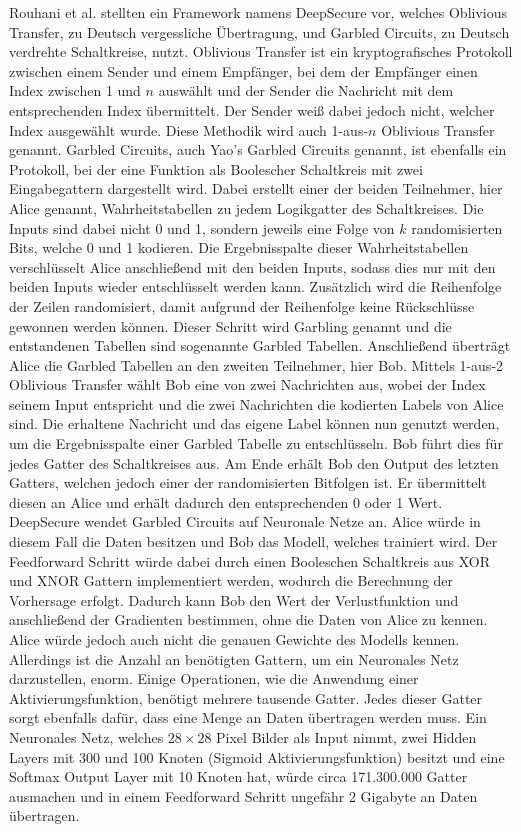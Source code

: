Rouhani et al. \cite{P-71} stellten ein Framework namens DeepSecure vor, welches Oblivious Transfer, zu Deutsch vergessliche Übertragung, und Garbled Circuits, zu Deutsch verdrehte Schaltkreise, nutzt.
Oblivious Transfer ist ein kryptografisches Protokoll zwischen einem Sender und einem Empfänger, bei dem der Empfänger einen Index zwischen 1 und $n$ auswählt und der Sender die Nachricht mit dem entsprechenden Index übermittelt. 
Der Sender weiß dabei jedoch nicht, welcher Index ausgewählt wurde.
Diese Methodik wird auch 1-aus-$n$ Oblivious Transfer genannt.
Garbled Circuits, auch Yao's Garbled Circuits genannt, ist ebenfalls ein Protokoll, bei der eine Funktion als Boolescher Schaltkreis mit zwei Eingabegattern dargestellt wird.
Dabei erstellt einer der beiden Teilnehmer, hier Alice genannt, Wahrheitstabellen zu jedem Logikgatter des Schaltkreises. 
Die Inputs sind dabei nicht 0 und 1, sondern jeweils eine Folge von $k$ randomisierten Bits, welche 0 und 1 kodieren.
Die Ergebnisspalte dieser Wahrheitstabellen verschlüsselt Alice anschließend mit den beiden Inputs, sodass dies nur mit den beiden Inputs wieder entschlüsselt werden kann. 
Zusätzlich wird die Reihenfolge der Zeilen randomisiert, damit aufgrund der Reihenfolge keine Rückschlüsse gewonnen werden können. 
Dieser Schritt wird Garbling genannt und die entstandenen Tabellen sind sogenannte Garbled Tabellen.
Anschließend überträgt Alice die Garbled Tabellen an den zweiten Teilnehmer, hier Bob.
Mittels 1-aus-2 Oblivious Transfer wählt Bob eine von zwei Nachrichten aus, wobei der Index seinem Input entspricht und die zwei Nachrichten die kodierten Labels von Alice sind.
Die erhaltene Nachricht und das eigene Label können nun genutzt werden, um die Ergebnisspalte einer Garbled Tabelle zu entschlüsseln.
Bob führt dies für jedes Gatter des Schaltkreises aus.
Am Ende erhält Bob den Output des letzten Gatters, welchen jedoch einer der randomisierten Bitfolgen ist. 
Er übermittelt diesen an Alice und erhält dadurch den entsprechenden 0 oder 1 Wert.
DeepSecure wendet Garbled Circuits auf Neuronale Netze an.
Alice würde in diesem Fall die Daten besitzen und Bob das Modell, welches trainiert wird.
Der Feedforward Schritt würde dabei durch einen Booleschen Schaltkreis aus XOR und XNOR Gattern implementiert werden, wodurch die Berechnung der Vorhersage erfolgt.
Dadurch kann Bob den Wert der Verlustfunktion und anschließend der Gradienten bestimmen, ohne die Daten von Alice zu kennen.
Alice würde jedoch auch nicht die genauen Gewichte des Modells kennen.
Allerdings ist die Anzahl an benötigten Gattern, um ein Neuronales Netz darzustellen, enorm.
Einige Operationen, wie die Anwendung einer Aktivierungsfunktion, benötigt mehrere tausende Gatter.
Jedes dieser Gatter sorgt ebenfalls dafür, dass eine Menge an Daten übertragen werden muss.
Ein Neuronales Netz, welches $28\times28$ Pixel Bilder als Input nimmt, zwei Hidden Layers mit 300 und 100 Knoten (Sigmoid Aktivierungsfunktion) besitzt und eine Softmax Output Layer mit 10 Knoten hat, würde circa 171.300.000 Gatter ausmachen und in einem Feedforward Schritt ungefähr 2 Gigabyte an Daten übertragen.

